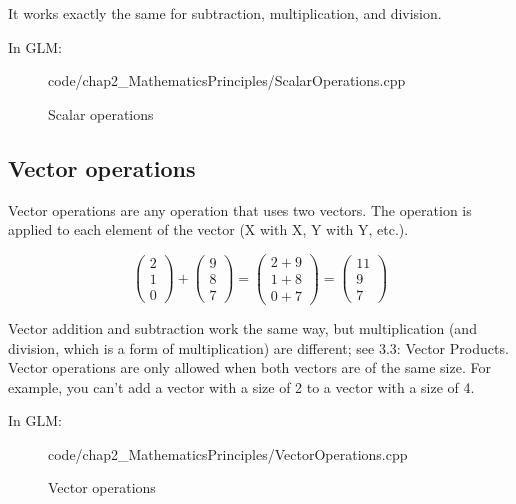It works exactly the same for subtraction, multiplication, and division.

In GLM:

\begin{frame}{}
    \begin{figure}[ht]
    \centering
    \colorbox{backgroundcolor}{
        \parbox{0.9\textwidth}{
            
            {code/chap2_MathematicsPrinciples/ScalarOperations.cpp}
        }
    }
    \caption{Scalar operations}
    \label{fig:scalar_operations}
    \end{figure}
\end{frame}

\subsection{\textsf{Vector operations}}
Vector operations are any operation that uses two vectors. The operation is applied to each element of the vector (X with X, Y with Y, etc.).

\begin{equation*}
\begin{pmatrix}
2\\
1\\
0
\end{pmatrix} +\begin{pmatrix}
9\\
8\\
7
\end{pmatrix} =\begin{pmatrix}
2+9\\
1+8\\
0+7
\end{pmatrix} =\begin{pmatrix}
11\\
9\\
7
\end{pmatrix}
\end{equation*}

Vector addition and subtraction work the same way, but multiplication (and division, which is a form of multiplication) are different; see 3.3: Vector Products. Vector operations are only allowed when both vectors are of the same size. For example, you can't add a vector with a size of 2 to a vector with a size of 4.

In GLM:

\begin{figure}[ht]
\centering
\colorbox{backgroundcolor}{
\parbox{0.9\textwidth}{

{code/chap2_MathematicsPrinciples/VectorOperations.cpp}
}
}
\caption{Vector operations}
\label{fig:vector_operations}
\end{figure}

